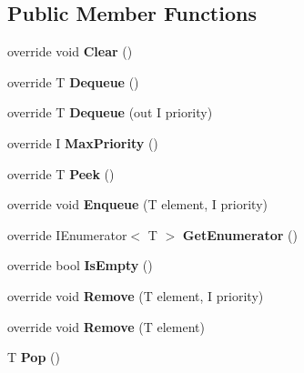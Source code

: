 \subsection*{Public Member Functions}
\begin{DoxyCompactItemize}
\item 
\mbox{\label{class_data_structures_1_1_list_priority_queue_a722492a974e4ae345f8765a6834b8ffb}} 
override void {\bfseries Clear} ()
\item 
\mbox{\label{class_data_structures_1_1_list_priority_queue_aa4291e0b9ea3a1612682335e80a6b010}} 
override T {\bfseries Dequeue} ()
\item 
\mbox{\label{class_data_structures_1_1_list_priority_queue_ac8f364895f67970aaed6dcfaf1290db1}} 
override T {\bfseries Dequeue} (out I priority)
\item 
\mbox{\label{class_data_structures_1_1_list_priority_queue_addd32118f7f7876c3d5b3a0757f6863c}} 
override I {\bfseries Max\+Priority} ()
\item 
\mbox{\label{class_data_structures_1_1_list_priority_queue_a1538115fa88eb48f79acb5b8c800b6a9}} 
override T {\bfseries Peek} ()
\item 
\mbox{\label{class_data_structures_1_1_list_priority_queue_a7aa8356d1d5029d49bed7824ecaf22e7}} 
override void {\bfseries Enqueue} (T element, I priority)
\item 
\mbox{\label{class_data_structures_1_1_list_priority_queue_a5e5a94d66964576ff2d0e6b8e3203d8a}} 
override I\+Enumerator$<$ T $>$ {\bfseries Get\+Enumerator} ()
\item 
\mbox{\label{class_data_structures_1_1_list_priority_queue_a601185c727c36ac12fca2a3653690a58}} 
override bool {\bfseries Is\+Empty} ()
\item 
\mbox{\label{class_data_structures_1_1_list_priority_queue_a8456610791d091dff91553039630607c}} 
override void {\bfseries Remove} (T element, I priority)
\item 
\mbox{\label{class_data_structures_1_1_list_priority_queue_a2cf5a418704255f9d0f837de6f7fa107}} 
override void {\bfseries Remove} (T element)
\item 
\mbox{\label{class_data_structures_1_1_list_priority_queue_a60d2e558bd2110d0d183fb47a5e7d93a}} 
T {\bfseries Pop} ()
\end{DoxyCompactItemize}
